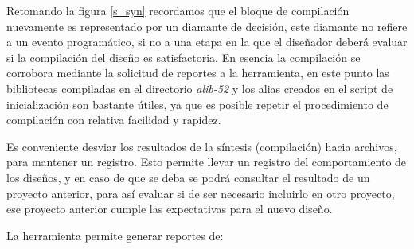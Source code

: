 Retomando la figura \ref{s_syn} recordamos que el bloque de compilación nuevamente es representado por un diamante de decisión, este diamante no refiere a un evento programático, si no a una etapa en la que el diseñador deberá evaluar si la compilación del diseño es satisfactoria. En esencia la compilación se corrobora mediante la solicitud de reportes a la herramienta, en este punto las bibliotecas compiladas en el directorio \textit{alib-52} y los alias creados en el script de inicialización son bastante útiles, ya que es posible repetir el procedimiento de compilación con relativa facilidad y rapidez.

Es conveniente desviar los resultados de la síntesis (compilación) hacia archivos, para mantener un registro. Esto permite llevar un registro del comportamiento de los diseños, y en caso de que se deba se podrá consultar el resultado de un proyecto anterior, para así evaluar si de ser necesario incluirlo en otro proyecto, ese proyecto anterior cumple las expectativas para el nuevo diseño.

La herramienta permite generar reportes de:

